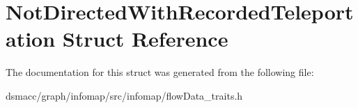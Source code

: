 \hypertarget{structNotDirectedWithRecordedTeleportation}{}\section{Not\+Directed\+With\+Recorded\+Teleportation Struct Reference}
\label{structNotDirectedWithRecordedTeleportation}


The documentation for this struct was generated from the following file\+:\begin{DoxyCompactItemize}
\item 
dsmacc/graph/infomap/src/infomap/flow\+Data\+\_\+traits.\+h\end{DoxyCompactItemize}
